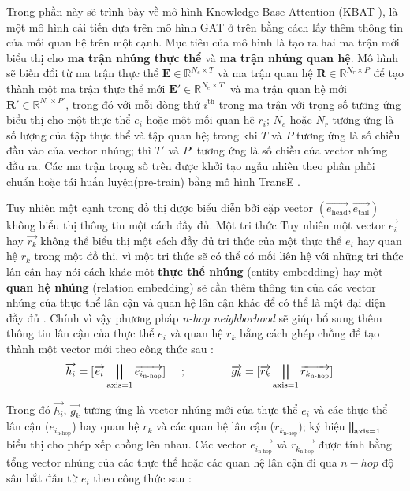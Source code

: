 Trong phần này sẽ trình bày về mô hình Knowledge Base Attention (KBAT \cite{nathani2019learning}), là một mô hình cải tiến dựa trên mô hình GAT ở trên bằng cách lấy thêm thông tin của mối quan hệ trên một cạnh. Mục tiêu của mô hình là tạo ra hai ma trận mới biểu thị cho \textbf{ma trận nhúng thực thể} và \textbf{ma trận nhúng quan hệ}. Mô hình sẽ biến đổi từ ma trận thực thể $\mathbf{E} \in \mathbb{R}^{N_e \times T}$ và ma trận quan hệ $\mathbf{R} \in \mathbb{R}^{N_r \times P}$ để tạo thành một ma trận thực thể mới $\mathbf{E'} \in \mathbb{R}^{N_e \times T'}$ và ma trận quan hệ mới $\mathbf{R'} \in \mathbb{R}^{N_r \times P'}$, trong đó với mỗi dòng thứ $i^{\text{th}}$ trong ma trận với trọng số tương ứng biểu thị cho một thực thể $e_i$ hoặc một mối quan hệ $r_i$; $N_e$ hoặc $N_r$ tương ứng là số lượng của tập thực thể và tập quan hệ; trong khi $T$ và $P$ tương ứng là số chiều đầu vào của vector nhúng; thì $T'$ và $P'$ tương ứng là số chiều của vector nhúng đầu ra. Các ma trận trọng số trên được khởi tạo ngẫu nhiên theo phân phối chuẩn hoặc tái huấn luyện(pre-train) bằng mô hình TransE \cite{bordes2013translating} .

Tuy nhiên một cạnh trong đồ thị được biểu diễn bởi cặp vector $(\overrightarrow{e_\text{head}}, \overrightarrow{e_\text{tail}})$ không biểu thị thông tin một cách đầy đủ. Một tri thức 
Tuy nhiên một vector $\overrightarrow{e_i}$ hay $\overrightarrow{r_k}$ không thể biểu thị một cách đầy đủ tri thức của một thực thể $e_i$ hay quan hệ $r_k$ trong một đồ thị, vì một tri thức sẽ có thể có mối liên hệ với những tri thức lân cận hay nói cách khác một \textbf{thực thể nhúng} (entity embedding) hay một \textbf{quan hệ nhúng} (relation embedding) sẽ cần thêm thông tin của các vector nhúng của thực thể lân cận và quan hệ lân cận khác để có thể là một đại diện đầy đủ . Chính vì vậy phương pháp \textit{n-hop neighborhood} \cite{lin2018multi} sẽ giúp bổ sung thêm thông tin lân cận của thực thể $e_i$ và quan hệ $r_k$ bằng cách ghép chồng để tạo thành một vector mới theo công thức sau :
\begin{align}
{\overrightarrow{h_i} = [\overrightarrow{e_i} \bigparallel_{\text{axis}=1} \overrightarrow{e_{i_{\text{n-hop}}}}]} \hspace{0.5cm};\hspace{1.5cm}&
{\overrightarrow{g_k} = [\overrightarrow{r_k} \bigparallel_{\text{axis}=1} \overrightarrow{r_{k_{\text{n-hop}}}}]}
\end{align}

Trong đó $\overrightarrow{h_i}$, $\overrightarrow{g_k}$ tương ứng là vector nhúng mới của thực thể $e_i$ và các thực thể lân cận ($e_{i_{\text{n-hop}}}$) hay quan hệ $r_k$ và các quan hệ lân cận ($r_{k_{\text{n-hop}}}$); ký hiệu $\bigparallel_{\text{axis}=1}$ biểu thị cho phép xếp chồng lên nhau. Các vector $\overrightarrow{e_{i_{\text{n-hop}}}}$ và $\overrightarrow{r_{k_{\text{n-hop}}}}$ được tính bằng tổng vector nhúng của các thực thể hoặc các quan hệ lân cận đi qua $n-hop$ độ sâu bắt đầu từ $e_i$ theo công thức sau : 


